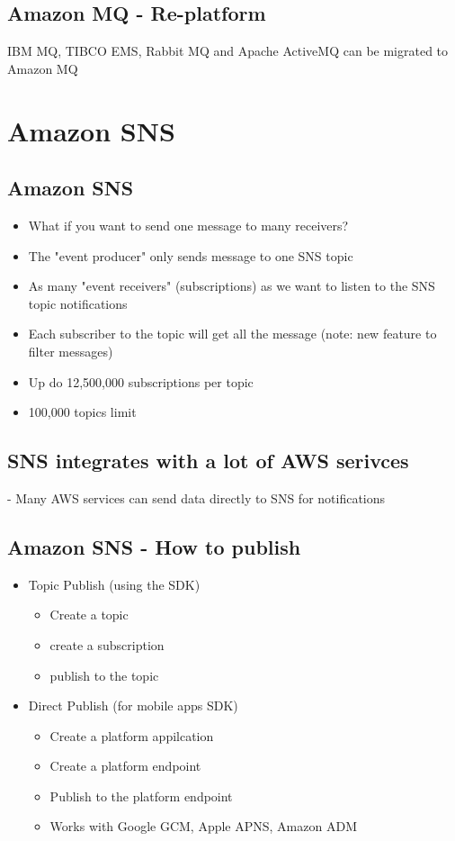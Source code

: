 \subsection{Amazon MQ - Re-platform}
IBM MQ, TIBCO EMS, Rabbit MQ and Apache ActiveMQ can be migrated to Amazon MQ


\section{Amazon SNS}

\subsection{Amazon SNS}
\begin{itemize}
    \item What if you want to send one message to many receivers?

    \item The "event producer" only sends message to one SNS topic
    \item As many "event receivers" (subscriptions) as we want to listen to the SNS topic notifications
    \item Each subscriber to the topic will get all the message (note: new feature to filter messages)
    \item Up do 12,500,000 subscriptions per topic
    \item 100,000 topics limit
\end{itemize}

\subsection{SNS integrates with a lot of AWS serivces}
- Many AWS services can send data directly to SNS for notifications

\subsection{Amazon SNS - How to publish}
\begin{itemize}
    \item Topic Publish (using the SDK)
    \begin{itemize}
        \item Create a topic
        \item create a subscription
        \item publish to the topic
    \end{itemize}
    \item Direct Publish (for mobile apps SDK)
    \begin{itemize}
        \item Create a platform appilcation
        \item Create a platform endpoint
        \item Publish to the platform endpoint
        \item Works with Google GCM, Apple APNS, Amazon ADM
    \end{itemize}
\end{itemize}

